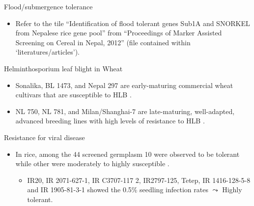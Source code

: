 \documentclass[11pt,dvipsnames,ignorenonframetext,aspectratio=169]{beamer}
\providecommand{\tightlist}{%
  \setlength{\itemsep}{0pt}\setlength{\parskip}{0pt}}
\begin{document}
\begin{frame}{Flood/submergence tolerance}
\protect\hypertarget{floodsubmergence-tolerance}{}
\begin{itemize}
\tightlist
\item
  Refer to the tile ``Identification of flood tolerant genes Sub1A and
  SNORKEL from Nepalese rice gene pool'' from ``Proceedings of Marker
  Assisted Screening on Cereal in Nepal, 2012'' (file contained within
  `literatures/articles').
\end{itemize}
\end{frame}

\begin{frame}{Helminthosporium leaf blight in Wheat}
\protect\hypertarget{helminthosporium-leaf-blight-in-wheat}{}
\begin{itemize}
\tightlist
\item
  Sonalika, BL 1473, and Nepal 297 are early-maturing commercial wheat
  cultivars that are susceptible to HLB
  \citep[\citet{van1998breeding}]{duveiller2004controlling}.
\item
  NL 750, NL 781, and Milan/Shanghai-7 are late-maturing, well-adapted,
  advanced breeding lines with high levels of resistance to HLB
  \citep[\citet{hetzler1991interactions}]{van1998breeding}.
\end{itemize}
\end{frame}

\begin{frame}{Resistance for viral disease}
\protect\hypertarget{resistance-for-viral-disease}{}
\begin{itemize}
\tightlist
\item
  In rice, among the 44 screened germplasm 10 were observed to be
  tolerant while other were moderately to highly susceptible
  \citep{upadhyay1982tetep}.

  \begin{itemize}
  \tightlist
  \item
    IR20, IR 2071-627-1, IR C3707-117 2, IR2797-125, Tetep, IR
    1416-128-5-8 and IR 1905-81-3-1 showed the 0.5\% seedling infection
    rates \(\leadsto\) Highly tolerant.
  \end{itemize}
\end{itemize}
\end{frame}
\end{document}
